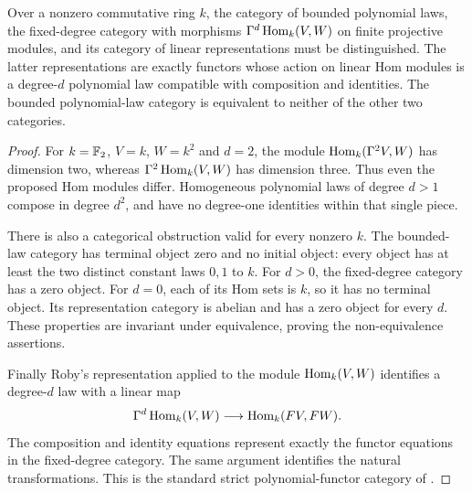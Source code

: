 \begin{proposition}\label{prop:three-polynomial-categories}
Over a nonzero commutative ring $k$, the category of bounded polynomial
laws, the fixed-degree category with morphisms
$\Gamma^d\operatorname{Hom}_k(V,W)$ on finite projective modules, and its category
of linear representations must be distinguished. The latter
representations are exactly functors whose action on linear Hom
modules is a degree-$d$ polynomial law compatible with composition
and identities. The bounded polynomial-law category is equivalent
to neither of the other two categories.
\end{proposition}
\begin{proof}
For $k=\mathbb F_2$, $V=k$, $W=k^2$ and $d=2$, the module
$\operatorname{Hom}_k(\Gamma^2V,W)$ has dimension two, whereas
$\Gamma^2\operatorname{Hom}_k(V,W)$ has dimension three. Thus even the proposed
Hom modules differ. Homogeneous polynomial laws of degree $d>1$
compose in degree $d^2$, and have no degree-one identities within
that single piece.

There is also a categorical obstruction valid for every nonzero
$k$. The bounded-law category has terminal object zero and no
initial object: every object has at least the two distinct constant
laws $0,1$ to $k$. For $d>0$, the fixed-degree category has a zero
object. For $d=0$, each of its Hom sets is $k$, so it has no
terminal object. Its representation category is abelian and has a
zero object for every $d$. These properties are invariant under
equivalence, proving the non-equivalence assertions.

Finally Roby's representation applied to the module
$\operatorname{Hom}_k(V,W)$ identifies a degree-$d$ law with a linear map
\[
 \Gamma^d\operatorname{Hom}_k(V,W)\longrightarrow\operatorname{Hom}_k(FV,FW).
\]
The composition and identity equations represent exactly the
functor equations in the fixed-degree category. The same argument
identifies the natural transformations. This is the standard strict
polynomial-functor category of \cite[Section~2, pp.~3--5]{Krause}.
\end{proof}
